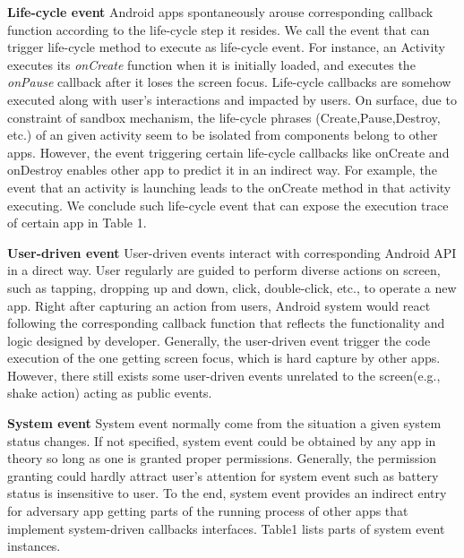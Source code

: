 \documentclass{sig-alternate-05-2015}
\begin{document}
\textbf{Life-cycle event} Android apps spontaneously arouse corresponding callback function according to the life-cycle step it resides. We call the event that can trigger life-cycle method to execute as life-cycle event. For instance, an Activity executes its \textit{onCreate} function when it is initially loaded, and executes the \textit{onPause} callback after it loses the screen focus. Life-cycle callbacks are somehow executed along with user's interactions and impacted by users. On surface, due to constraint of sandbox mechanism, the life-cycle phrases (Create,Pause,Destroy, etc.) of an given activity seem to be isolated from components belong to other apps. However, the event triggering certain life-cycle callbacks like onCreate and onDestroy enables other app to predict it in an indirect way. For example, the event that an activity is launching leads to the onCreate method in that activity executing. We conclude such life-cycle event that can expose the execution trace of certain app in Table 1.

\textbf{User-driven event} User-driven events interact with corresponding Android API in a direct way. User regularly are guided to perform diverse actions on screen, such as tapping, dropping up and down, click, double-click, etc., to operate a new app. Right after capturing an action from users, Android system would react following the  corresponding callback function that reflects the functionality and logic designed by developer. Generally, the user-driven event trigger the code execution of the one getting screen focus, which is hard capture by other apps. However, there still exists some user-driven events unrelated to the screen(e.g., shake action) acting as public events. 

\textbf{System event} System event normally come from the situation a given system status changes. If not specified, system event could be obtained by any app in theory so long as one is granted proper permissions. Generally, the permission granting could hardly attract user's attention for system event such as battery status is insensitive to user. To the end, system event provides an indirect entry for adversary app getting parts of the running process of other apps that implement system-driven callbacks interfaces. Table1 lists parts of system event instances.
\end{document}
